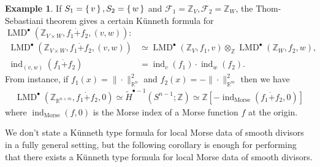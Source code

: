 \documentclass[a4paper,dvipdfmx,reqno,12pt]{amsart}
\theoremstyle{definition}
\newtheorem{example}[theorem]{Example}
\newcommand{\Z}{\mathbb{Z}}%
\newcommand{\mcal}[1]{\mathcal{#1}}%
\newcommand{\opn}[1]{\operatorname{#1}}
\numberwithin{equation}{section}
\begin{document}
\begin{example}
  If $S_1=\set{v},S_2=\set{w}$ and $\mcal{F}_1=\Z_V, \mcal{F}_2=\Z_{W}$,
  the Thom-Sebastiani theorem gives
  a certain K\"unneth formula for
  $\opn{LMD}^{\bullet}(\Z_{V\times W},f_1\dot{+}f_2,(v,w))$:
\begin{align}
\opn{LMD}^{\bullet}(\Z_{V\times W},f_1\dot{+}f_2,(v,w))
&\simeq \opn{LMD}^{\bullet}(\Z_{V},f_1,v)
\otimes_{\Z} \opn{LMD}^{\bullet}(\Z_{W},f_2,w), \quad \\
\opn{ind}_{(v,w)}(f_1\dot{+}f_2)&=\opn{ind}_v(f_1)\cdot 
\opn{ind}_w(f_2).
\end{align}
  From instance, if $f_1(x)=\|\cdot\|_{\mathbb{R}^{n}}^{2}$
  and $f_2(x)=-\|\cdot\|_{\mathbb{R}^{m}}^{2}$ then we have
\begin{align}
    \opn{LMD}^{\bullet}(\Z_{{\mathbb{R}}^{n+m}},f_1\dot{+}f_2,0)
    \simeq \tilde{H}^{\bullet -1}(S^{n-1};\Z)
    \simeq \Z[-\opn{ind}_{\mathrm{Morse}}(f_1\dot{+}f_2,0)]
\end{align}
  where $\opn{ind}_{\mathrm{Morse}}(f,0)$ is the Morse index
  of a Morse function $f$ at the origin.
\end{example}

We don't state a K\"unneth type formula for 
local Morse data of smooth divisors in a fully
general setting, but the following corollary 
is enough for performing that there exists 
a K\"unneth type formula for local Morse data
of smooth divisors.
\end{document}
